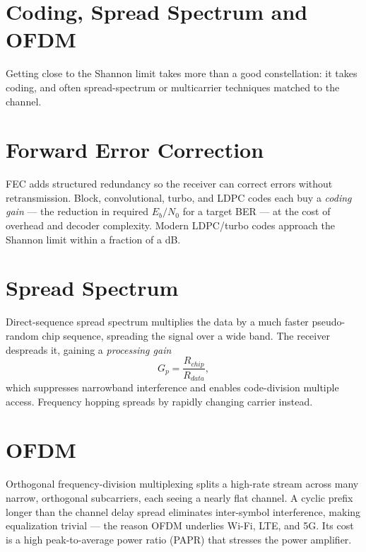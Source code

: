 \section{Coding, Spread Spectrum and OFDM}\label{sec:tb_coding}



Getting close to the Shannon limit takes more than a good constellation: it takes
coding, and often spread-spectrum or multicarrier techniques matched to the
channel.

\section{Forward Error Correction}
FEC adds structured redundancy so the receiver can correct errors without
retransmission. Block, convolutional, turbo, and LDPC codes each buy a
\emph{coding gain} --- the reduction in required $E_b/N_0$ for a target BER ---
at the cost of overhead and decoder complexity. Modern LDPC/turbo codes approach
the Shannon limit within a fraction of a dB.

\section{Spread Spectrum}
Direct-sequence spread spectrum multiplies the data by a much faster pseudo-random
chip sequence, spreading the signal over a wide band. The receiver despreads it,
gaining a \emph{processing gain}
\[ G_p = \frac{R_{chip}}{R_{data}}, \]
which suppresses narrowband interference and enables code-division multiple
access. Frequency hopping spreads by rapidly changing carrier instead.

\section{OFDM}
Orthogonal frequency-division multiplexing splits a high-rate stream across many
narrow, orthogonal subcarriers, each seeing a nearly flat channel. A cyclic
prefix longer than the channel delay spread eliminates inter-symbol interference,
making equalization trivial --- the reason OFDM underlies Wi-Fi, LTE, and 5G. Its
cost is a high peak-to-average power ratio (PAPR) that stresses the power
amplifier.



